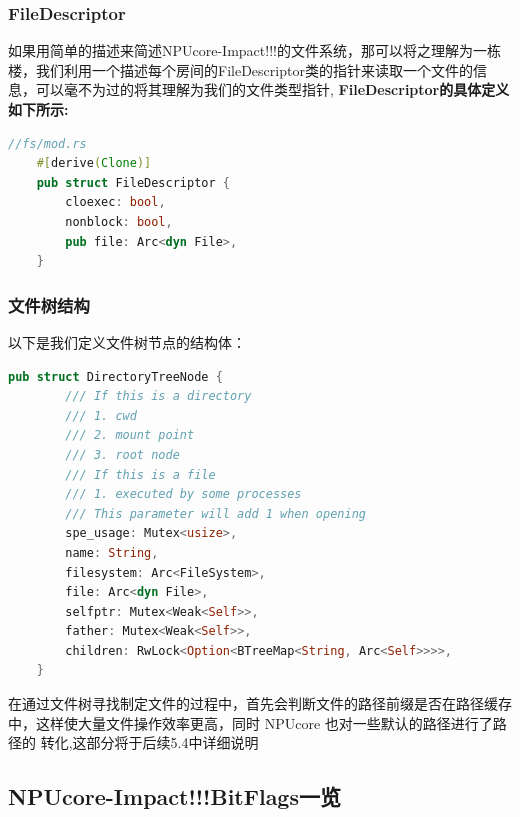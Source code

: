 \subsubsection{FileDescriptor}

如果用简单的描述来简述NPUcore-Impact!!!的文件系统，那可以将之理解为一栋楼，我们利用一个描述每个房间的FileDescriptor类的指针来读取一个文件的信息，可以毫不为过的将其理解为我们的文件类型指针, \textbf{FileDescriptor的具体定义如下所示:}

\begin{lstlisting}[language={rust}, label={code:refill}, caption={FileDescriptor}]
    //fs/mod.rs
    #[derive(Clone)]
    pub struct FileDescriptor {
        cloexec: bool,
        nonblock: bool,
        pub file: Arc<dyn File>,
    }
\end{lstlisting}

\subsubsection{文件树结构}

以下是我们定义文件树节点的结构体：

\begin{lstlisting}[language={rust}, label={code:refill}, caption={FileDescriptor}]
    pub struct DirectoryTreeNode {
        /// If this is a directory
        /// 1. cwd
        /// 2. mount point
        /// 3. root node
        /// If this is a file
        /// 1. executed by some processes
        /// This parameter will add 1 when opening
        spe_usage: Mutex<usize>,
        name: String,
        filesystem: Arc<FileSystem>,
        file: Arc<dyn File>,
        selfptr: Mutex<Weak<Self>>,
        father: Mutex<Weak<Self>>,
        children: RwLock<Option<BTreeMap<String, Arc<Self>>>>,
    }
\end{lstlisting}

在通过文件树寻找制定文件的过程中，首先会判断文件的路径前缀是否在路径缓存
中，这样使大量文件操作效率更高，同时 NPUcore 也对一些默认的路径进行了路径的
转化,这部分将于后续5.4中详细说明

\subsection{NPUcore-Impact!!!BitFlags一览}

